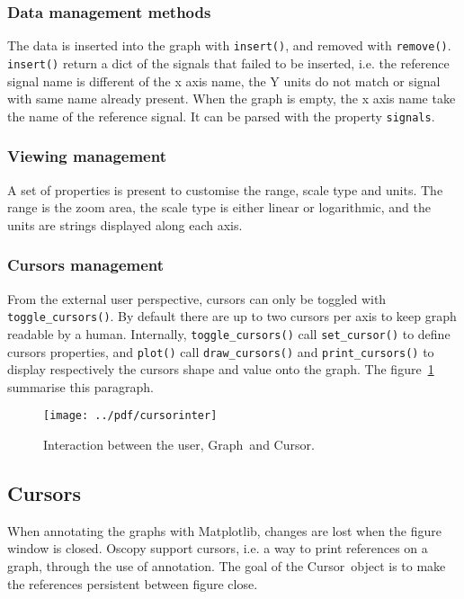 \documentclass[a4paper,11pt]{article}
\newcommand{\meth}[1]{\texttt{#1()}}
\newcommand{\cls}[1]{\textsf{#1}}
\newcommand{\prop}[1]{\texttt{#1}}
\newcommand{\graph}{\cls{Graph}}
\newcommand{\cursor}{\cls{Cursor}}
\begin{document}
\subsubsection{Data management methods}
The data is inserted into the graph with \meth{insert}, and removed with \meth{remove}.
\meth{insert} return a dict of the signals that failed to be inserted, i.e. the reference signal name is different of the x axis name, the Y units do not match or signal with same name already present.
When the graph is empty, the x axis name take the name of the reference signal.
It can be parsed with the property \prop{signals}.

\subsubsection{Viewing management}
A set of properties is present to customise the range, scale type and units.
The range is the zoom area, the scale type is either linear or logarithmic, and the units are strings displayed along each axis.

\subsubsection{Cursors management}
From the external user perspective, cursors can only be toggled with \meth{toggle\_cursors}.
By default there are up to two cursors per axis to keep graph readable by a human.
Internally, \meth{toggle\_cursors} call \meth{set\_cursor} to define cursors properties, and \meth{plot} call \meth{draw\_cursors} and \meth{print\_cursors} to display respectively the cursors shape and value onto the graph.
The figure~\ref{fig:cursorinter} summarise this paragraph.

\begin{figure}[htbp]
  \centering
  \texttt{[image: ../pdf/cursorinter]}
  \caption{Interaction between the user, \graph\ and \cursor.}
  \label{fig:cursorinter}
\end{figure}

\subsection{Cursors}
\label{sec:curs}
When annotating the graphs with Matplotlib, changes are lost when the figure window is closed.
Oscopy support cursors, i.e. a way to print references on a graph, through the use of annotation.
The goal of the \cursor\ object is to make the references persistent between figure close.
\end{document}
